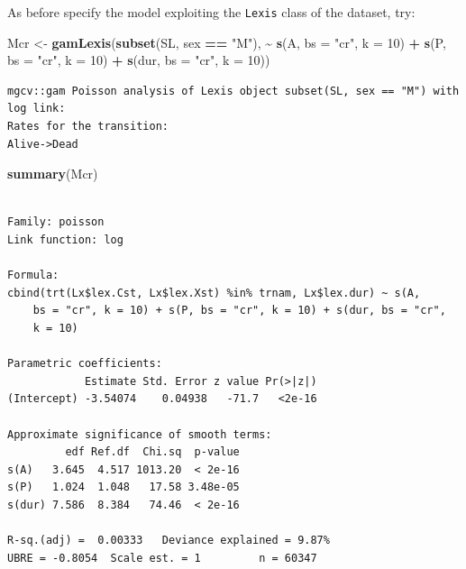 \documentclass[
]{book}
\newenvironment{Shaded}{\begin{snugshade}}{\end{snugshade}}
\newcommand{\AttributeTok}[1]{\textcolor[rgb]{0.13,0.29,0.53}{#1}}
\newcommand{\DecValTok}[1]{\textcolor[rgb]{0.00,0.00,0.81}{#1}}
\newcommand{\FunctionTok}[1]{\textcolor[rgb]{0.13,0.29,0.53}{\textbf{#1}}}
\newcommand{\NormalTok}[1]{#1}
\newcommand{\OtherTok}[1]{\textcolor[rgb]{0.56,0.35,0.01}{#1}}
\newcommand{\SpecialCharTok}[1]{\textcolor[rgb]{0.81,0.36,0.00}{\textbf{#1}}}
\newcommand{\StringTok}[1]{\textcolor[rgb]{0.31,0.60,0.02}{#1}}
\theoremstyle{definition}
\theoremstyle{definition}
\theoremstyle{definition}
\theoremstyle{definition}
\theoremstyle{remark}
\begin{document}
\begin{enumerate}
  As before specify the model exploiting the \texttt{Lexis} class of the dataset, try:

\begin{Shaded}
\begin{Highlighting}[]
\NormalTok{Mcr }\OtherTok{\textless{}{-}} \FunctionTok{gamLexis}\NormalTok{(}\FunctionTok{subset}\NormalTok{(SL, sex }\SpecialCharTok{==} \StringTok{"M"}\NormalTok{),}
                 \SpecialCharTok{\textasciitilde{}} \FunctionTok{s}\NormalTok{(A, }\AttributeTok{bs =} \StringTok{"cr"}\NormalTok{, }\AttributeTok{k =} \DecValTok{10}\NormalTok{) }\SpecialCharTok{+}
                   \FunctionTok{s}\NormalTok{(P, }\AttributeTok{bs =} \StringTok{"cr"}\NormalTok{, }\AttributeTok{k =} \DecValTok{10}\NormalTok{) }\SpecialCharTok{+}
                 \FunctionTok{s}\NormalTok{(dur, }\AttributeTok{bs =} \StringTok{"cr"}\NormalTok{, }\AttributeTok{k =} \DecValTok{10}\NormalTok{))}
\end{Highlighting}
\end{Shaded}

\begin{verbatim}
mgcv::gam Poisson analysis of Lexis object subset(SL, sex == "M") with log link:
Rates for the transition:
Alive->Dead
\end{verbatim}

\begin{Shaded}
\begin{Highlighting}[]
\FunctionTok{summary}\NormalTok{(Mcr)}
\end{Highlighting}
\end{Shaded}

\begin{verbatim}

Family: poisson 
Link function: log 

Formula:
cbind(trt(Lx$lex.Cst, Lx$lex.Xst) %in% trnam, Lx$lex.dur) ~ s(A, 
    bs = "cr", k = 10) + s(P, bs = "cr", k = 10) + s(dur, bs = "cr", 
    k = 10)

Parametric coefficients:
            Estimate Std. Error z value Pr(>|z|)
(Intercept) -3.54074    0.04938   -71.7   <2e-16

Approximate significance of smooth terms:
         edf Ref.df  Chi.sq  p-value
s(A)   3.645  4.517 1013.20  < 2e-16
s(P)   1.024  1.048   17.58 3.48e-05
s(dur) 7.586  8.384   74.46  < 2e-16

R-sq.(adj) =  0.00333   Deviance explained = 9.87%
UBRE = -0.8054  Scale est. = 1         n = 60347
\end{verbatim}


\end{enumerate}
\end{document}
